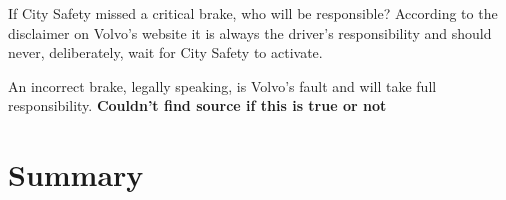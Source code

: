 \documentclass[conference]{IEEEtran}
\begin{document}
If City Safety missed a critical brake, who will be responsible? According to the disclaimer on Volvo's website it is always the driver's responsibility and should never, deliberately, wait for City Safety to activate. \cite{CitySafetyLegal}

An incorrect brake, legally speaking, is Volvo's fault and will take full responsibility. \textbf{Couldn't find source if this is true or not}


\section{Summary}

\end{document}
